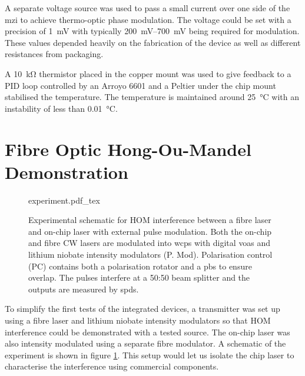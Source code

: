 A separate voltage source was used to pass a small current over one side of the \ac{mzi} to achieve thermo-optic phase modulation. The voltage could be set with a precision of \SI{1}{\mV} with typically \SIrange{200}{700}{\mV} being required for modulation. These values depended heavily on the fabrication of the device as well as different resistances from packaging.

A \SI{10}{\kilo\ohm} thermistor placed in the copper mount was used to give feedback to a PID loop controlled by an Arroyo 6601 and a Peltier under the chip mount stabilised the temperature. The temperature is maintained around \SI{25}{\celsius} with an instability of less than \SI{0.01}{\celsius}. 

\section{Fibre Optic Hong-Ou-Mandel Demonstration}

\begin{figure}[t]
	\centering
	\def\svgwidth{\textwidth} 
	{experiment.pdf_tex}
	\caption[Fibre-chip HOM experimental setup]{Experimental schematic for \ac{HOM} interference between a fibre laser and on-chip laser with external pulse modulation. Both the on-chip and fibre \ac{CW} lasers are modulated into \acp{wcp} with digital \acp{voa} and lithium niobate intensity modulators (P. Mod). Polarisation control (PC) contains both a polarisation rotator and a \ac{pbs} to ensure overlap. The pulses interfere at a {50:50} beam splitter and the outputs are measured by \acp{spd}.}
	\label{fig:fibre_chip_exp}
\end{figure}

To simplify the first tests of the integrated devices, a transmitter was set up using a fibre laser and lithium niobate intensity modulators so that \ac{HOM} interference could be demonstrated with a tested source. The on-chip laser was also intensity modulated using a separate fibre modulator. A schematic of the experiment is shown in figure \ref{fig:fibre_chip_exp}. This setup would let us isolate the chip laser to characterise the interference using commercial components.




